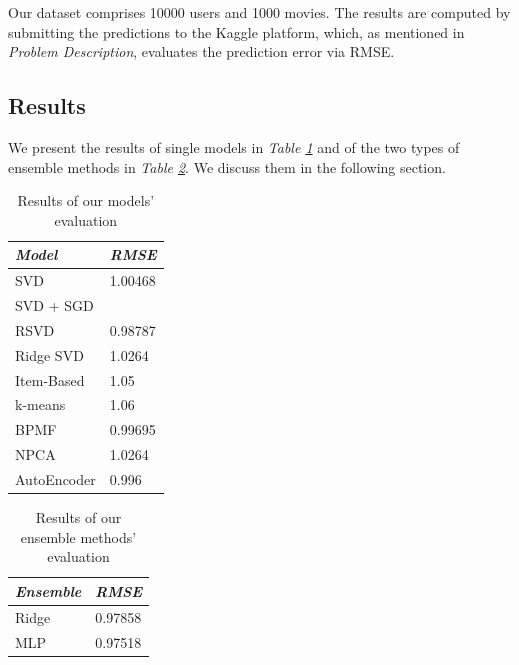 \documentclass[10pt,conference,compsocconf]{IEEEtran}
\begin{document}
Our dataset comprises 10000 users and 1000 movies. The results are computed by submitting the predictions to the Kaggle platform, which, as mentioned in \emph{Problem Description}, evaluates the prediction error via RMSE.

\subsection{Results}

We present the results of single models in \emph{Table \ref{tabres}} and of the two types of ensemble methods in \emph{Table \ref{ensres}}. We discuss them in the following section.

\begin{table}[h!]
	\centering
	\begin{tabular}{l|l}
		\textit{\textbf{Model}} & \textit{\textbf{RMSE}} \\
		\hline
		SVD                     &       1.00468                 \\
		SVD + SGD               &                        \\
		RSVD       	            &        0.98787                \\
		Ridge SVD               &        1.0264                \\
		Item-Based              &        1.05                \\
		k-means                 &        1.06                \\
		BPMF                    &        0.99695               \\
		NPCA                    &        1.0264          \\
		AutoEncoder             &        0.996               
	\end{tabular}
\caption{Results of our models' evaluation}
\label{tabres}
\end{table}

\begin{table}[h!]
	\centering
	\begin{tabular}{l|l}
		\textit{\textbf{Ensemble}} & \textit{\textbf{RMSE}} \\
		\hline
		Ridge                     &      0.97858                 \\
		MLP      	            &         0.97518                                   
	\end{tabular}
\caption{Results of our ensemble methods' evaluation}
\label{ensres}
\end{table}
\end{document}
